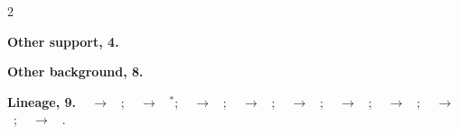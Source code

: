 \documentclass[10pt]{article}
\newcommand{\memb}[1]{\par\smallskip\textbf{#1}\quad}
\begin{document}
\begin{multicols}{2}
\memb{Other support, 4.} \citetext{\citealp{Osband-behaviour20}; \citealp{Russo-information14}; \citealp{Lu-reinforcement21}; \citealp{Arumugam-deciding22}}

\memb{Other background, 8.} {\footnotesize \citetext{\citealp{Jaksch-nearoptimal10}\dag; \citealp{Amin-survey21}; \citealp{Kirschner-information18}; \citealp{Nikolov-informationdirected18}; \citealp{Lu-information19}; \citealp{Arumugam-deciding21}; \citealp{Hao-regret22}; \citealp{Shufaro-bits24}}}

\end{multicols}
\memb{Lineage, 9.} {\footnotesize \citeauthor{Thompson-likelihood33}~\citeyear{Thompson-likelihood33} $\to$ \citeauthor{Strens-bayesian00}~\citeyear{Strens-bayesian00}; \citeauthor{Thompson-likelihood33}~\citeyear{Thompson-likelihood33} $\to$ \citeauthor{Ortega-minimum08}~\citeyear{Ortega-minimum08}$^\ast$; \citeauthor{Strens-bayesian00}~\citeyear{Strens-bayesian00} $\to$ \citeauthor{Osband-more13}~\citeyear{Osband-more13}; \citeauthor{Osband-more13}~\citeyear{Osband-more13} $\to$ \citeauthor{Osband-deep17}~\citeyear{Osband-deep17}; \citeauthor{Russo-information14}~\citeyear{Russo-information14} $\to$ \citeauthor{Russo-learning14}~\citeyear{Russo-learning14}; \citeauthor{Russo-learning14b}~\citeyear{Russo-learning14b} $\to$ \citeauthor{Russo-information14}~\citeyear{Russo-information14}; \citeauthor{Russo-learning14}~\citeyear{Russo-learning14} $\to$ \citeauthor{Lu-reinforcement21}~\citeyear{Lu-reinforcement21}; \citeauthor{Osband-deep17}~\citeyear{Osband-deep17} $\to$ \citeauthor{Osband-behaviour20}~\citeyear{Osband-behaviour20}; \citeauthor{Lu-reinforcement21}~\citeyear{Lu-reinforcement21} $\to$ \citeauthor{Arumugam-deciding22}~\citeyear{Arumugam-deciding22}.}
\end{document}
